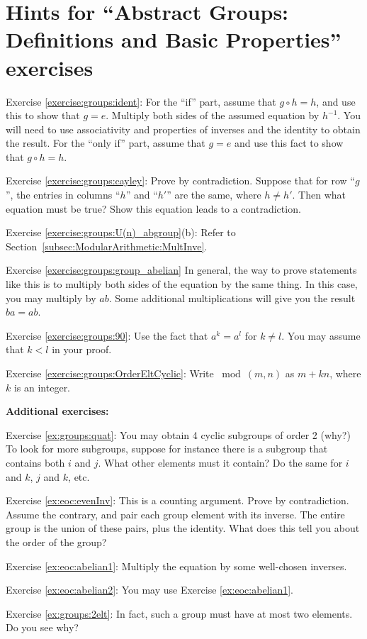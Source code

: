 \section{Hints for ``Abstract Groups: Definitions and Basic Properties'' exercises}
\label{sec:Groups:Hints}

\noindent Exercise \ref{exercise:groups:ident}: For the ``if'' part, assume that $g \circ h = h$, and use this to show that $g = e$. Multiply both sides of the assumed equation by $h^{-1}$. You will need to use associativity and properties of inverses and the identity to obtain the result.  For the ``only if'' part, assume that $g=e$ and use this fact to show that $g \circ h = h$.

\noindent Exercise \ref{exercise:groups:cayley}: Prove by contradiction. Suppose that for row ``$g$'', the entries in columns ``$h$'' and ``$h'$'' are the same, where $h \neq h'$.  Then what equation must be true? Show this equation leads to a contradiction.

\noindent Exercise \ref{exercise:groups:U(n)_abgroup}(b): Refer to Section~\ref{subsec:ModularArithmetic:MultInve}.

\noindent Exercise \ref{exercise:groups:group_abelian} In general, the way to prove statements like this is to multiply both sides of the equation by the same thing.  In this case, you may multiply by $ab$.  Some additional multiplications will give you the result $ba=ab$.

\noindent Exercise \ref{exercise:groups:90}: Use the fact that $a^k = a^l$ for $k \neq l$.  You may assume that $k < l$ in your proof.

\noindent Exercise \ref{exercise:groups:OrderEltCyclic}: Write $\bmod(m,n)$ as $m + kn$, where $k$ is an integer.

\bigskip

\textbf{Additional exercises:}

\noindent Exercise \ref{ex:groups:quat}: You may obtain 4 cyclic subgroups of order 2 (why?)  To look for more subgroups, suppose for instance there is a subgroup that contains both $i$ and $j$.  What other elements must it contain?  Do the same for $i$ and $k$, $j$ and $k$, etc.

\noindent Exercise \ref{ex:eoc:evenInv}: This is a counting argument. Prove by contradiction. Assume the contrary, and pair each group element with its inverse. The entire group is the union of these pairs, plus the identity. What does this tell you about the order of the group?

\noindent Exercise \ref{ex:eoc:abelian1}: Multiply the equation by some well-chosen inverses.

\noindent Exercise \ref{ex:eoc:abelian2}: You may use Exercise \ref{ex:eoc:abelian1}.

\noindent Exercise \ref{ex:groups:2elt}: In fact, such a group must have at most two elements. Do you see why?

